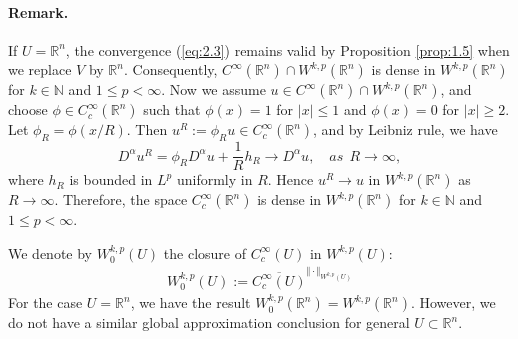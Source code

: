 \documentclass{article}
\numberwithin{equation}{section}
\newcommand{\bbN}{\mathbb{N}}
\newcommand{\bbR}{\mathbb{R}}
\newcommand{\ol}{\overline}
\theoremstyle{plain}
\theoremstyle{definition}
\begin{document}
\paragraph{Remark.} If $U=\bbR^n$, the convergence (\ref{eq:2.3}) remains valid by Proposition \ref{prop:1.5} when we replace $V$ by $\bbR^n$. Consequently, $C^\infty(\bbR^n)\cap W^{k,p}(\bbR^n)$ is dense in $W^{k,p}(\bbR^n)$ for $k\in\bbN$ and $1\leq p<\infty$. Now we assume $u\in C^\infty(\bbR^n)\cap W^{k,p}(\bbR^n)$, and choose $\phi\in C_c^\infty(\bbR^n)$ such that $\phi(x)=1$ for $\vert x\vert\leq 1$ and $\phi(x)=0$ for $\vert x\vert\geq 2$. Let $\phi_R=\phi(x/R)$. Then $u^R:=\phi_Ru\in C_c^\infty(\bbR^n)$, and by Leibniz rule, we have 
$$D^\alpha u^R=\phi_RD^\alpha u+\frac{1}{R}h_R\to D^\alpha u,\quad\textit{as}\ \ R\to\infty,$$ 
where $h_R$ is bounded in $L^p$ uniformly in $R$. Hence $u^R\to u$ in $W^{k,p}(\bbR^n)$ as $R\to\infty$. Therefore, the space $C^\infty_c(\bbR^n)$ is dense in $W^{k,p}(\bbR^n)$ for $k\in\bbN$ and $1\leq p<\infty$.

We denote by $W_0^{k,p}(U)$ the closure of $C_c^\infty(U)$ in $W^{k,p}(U)$:
\begin{align*}
	W_0^{k,p}(U):=\ol{C_c^\infty(U)}^{\Vert\cdot\Vert_{W^{k,p}(U)}}
\end{align*}
For the case $U=\bbR^n$, we have the result $W_0^{k,p}(\bbR^n)=W^{k,p}(\bbR^n)$. However, we do not have a similar global approximation conclusion for general $U\subset\bbR^n$.
\end{document}
